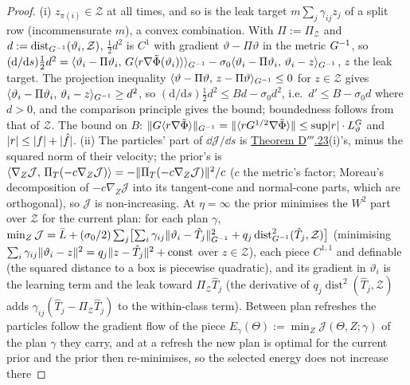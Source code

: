 \begin{proof}
(i) $z_{\pi(i)}\in\mathcal{Z}$ at all times, and so is the leak target $m\sum_j\gamma_{ij}z_j$ of a split row
(incommensurate $m$), a convex combination. With $\Pi := \Pi_{\mathcal{Z}}$ and
$d := \operatorname{dist}_{G^{-1}}(\vartheta_i,\mathcal{Z})$, $\frac12d^2$ is $C^1$ with gradient
$\vartheta - \Pi\vartheta$ in the metric $G^{-1}$, so
$(\mathrm{d}/\mathrm{d}s)\frac12d^2
= \langle \vartheta_i - \Pi\vartheta_i,\, G\langle r\nabla\tilde\Phi(\vartheta_i)\rangle\rangle_{G^{-1}}
- \sigma_0\langle \vartheta_i - \Pi\vartheta_i,\, \vartheta_i - z\rangle_{G^{-1}}$, $z$ the leak target. The
projection inequality $\langle \vartheta - \Pi\vartheta,\, z - \Pi\vartheta\rangle_{G^{-1}}\le0$ for $z\in\mathcal{Z}$ gives
$\langle \vartheta_i - \Pi\vartheta_i,\, \vartheta_i - z\rangle_{G^{-1}}\ge d^2$, so
$(\mathrm{d}/\mathrm{d}s)\frac12d^2\le Bd - \sigma_0d^2$, i.e.\ $d'\le B - \sigma_0d$ where $d > 0$, and the
comparison principle gives the bound; boundedness follows from that of $\mathcal{Z}$. The bound on $B$:
$\lVert G\langle r\nabla\tilde\Phi\rangle\rVert_{G^{-1}} = \lVert \langle rG^{1/2}\nabla\tilde\Phi\rangle\rVert
\le\sup\lvert r\rvert\cdot L_\vartheta^G$ and $\lvert r\rvert\le\lvert f\rvert + \lvert \hat f\rvert$. (ii) The particles' part of
$\dd\mathcal{J}/\dd s$ is \hyperref[res:thmDppp:23]{Theorem D$'''$.23}(i)'s, minus the squared norm of their
velocity; the prior's is
$\langle \nabla_Z\mathcal{J},\, \Pi_T(-c\nabla_Z\mathcal{J})\rangle = -\lVert \Pi_T(-c\nabla_Z\mathcal{J})\rVert^2/c$ ($c$ the metric's
factor; Moreau's decomposition of $-c\nabla_Z\mathcal{J}$ into its tangent-cone and normal-cone parts, which are
orthogonal), so $\mathcal{J}$ is non-increasing. At $\eta = \infty$ the prior minimises the $W^2$ part over
$\mathcal{Z}$ for the current plan: for each plan $\gamma$,
$\min_Z\mathcal{J} = \bar L + (\sigma_0/2)\sum_j\bigl[\sum_i\gamma_{ij}\lVert \vartheta_i - \hat T_j\rVert^2_{G^{-1}}
+ q_j\operatorname{dist}^2_{G^{-1}}(\hat T_j,\mathcal{Z})\bigr]$ (minimising
$\sum_i\gamma_{ij}\lVert \vartheta_i - z\rVert^2 = q_j\lVert z - \hat T_j\rVert^2 + \mathrm{const}$ over $z\in\mathcal{Z}$), each
piece $C^{1,1}$ and definable (the squared distance to a box is piecewise quadratic), and its gradient in
$\vartheta_i$ is the learning term and the leak toward $\Pi_{\mathcal{Z}}\hat T_j$ (the derivative of
$q_j\operatorname{dist}^2(\hat T_j,\mathcal{Z})$ adds $\gamma_{ij}(\hat T_j - \Pi_{\mathcal{Z}}\hat T_j)$ to the
within-class term). Between plan refreshes the particles follow the gradient flow of the piece
$E_\gamma(\Theta) := \min_Z\mathcal{J}(\Theta,Z;\gamma)$ of the plan $\gamma$ they carry, and at a refresh the new
plan is optimal for the current prior and the prior then re-minimises, so the selected energy does not increase there

\end{proof}
